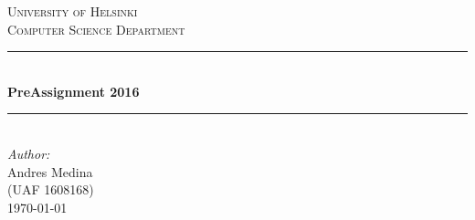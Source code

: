 \documentclass[12p]{article}
\begin{document}

\begin{titlepage}


\newcommand{\HRule}{\rule{\linewidth}{0.5mm}} %

\center %
 

\textsc{\Huge University of Helsinki}\\[2cm] %
\textsc{\LARGE Computer Science Department}\\[0.5cm] %


\HRule \\[0.4cm]
{ \Huge \bfseries PreAssignment 2016}\\[0.4cm] %
\HRule \\[2.5cm]
 


\LARGE \emph{Author:}\\
\LARGE Andres Medina\\[0.05cm] %
\textsc{\Large (UAF 1608168)}\\[3cm] %


{\LARGE \today}\\[3cm] %

 

\vfill %

\end{titlepage}
\end{document}
